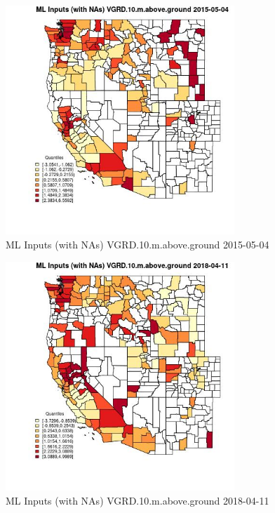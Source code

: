 \begin{figure} 
\centering  
\includegraphics[width=0.77\textwidth]{Code_Outputs/Report_ML_input_PM25_Step4_part_e_de_duplicated_aves_compiled_2019-05-18wNAs_CountyVGRD10mabovegroundMean2015-05-04_2015-05-04.jpg} 
\caption{\label{fig:Report_ML_input_PM25_Step4_part_e_de_duplicated_aves_compiled_2019-05-18wNAsCountyVGRD10mabovegroundMean2015-05-04_2015-05-04}ML Inputs (with NAs) VGRD.10.m.above.ground 2015-05-04} 
\end{figure} 
 

\begin{figure} 
\centering  
\includegraphics[width=0.77\textwidth]{Code_Outputs/Report_ML_input_PM25_Step4_part_e_de_duplicated_aves_compiled_2019-05-18wNAs_CountyVGRD10mabovegroundMean2018-04-11_2018-04-11.jpg} 
\caption{\label{fig:Report_ML_input_PM25_Step4_part_e_de_duplicated_aves_compiled_2019-05-18wNAsCountyVGRD10mabovegroundMean2018-04-11_2018-04-11}ML Inputs (with NAs) VGRD.10.m.above.ground 2018-04-11} 
\end{figure} 
 

